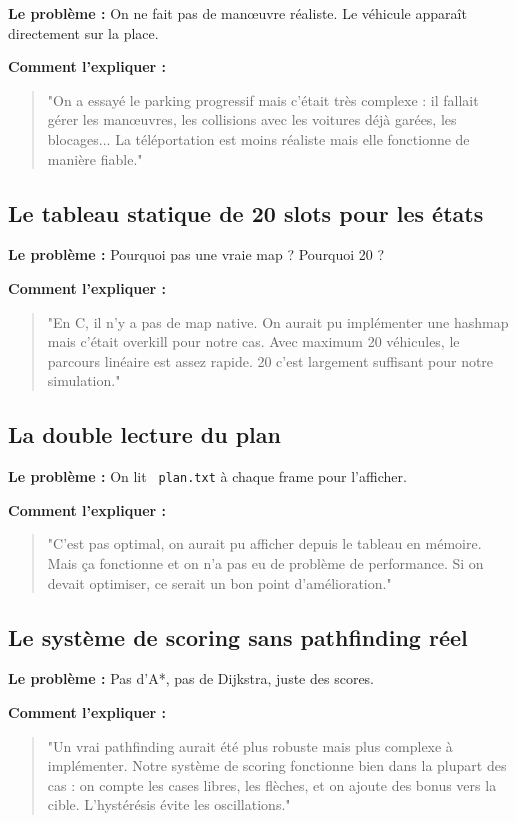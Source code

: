 \documentclass[11pt,a4paper]{article}
\newcommand{\fichier}[1]{\texttt{\textcolor{primary}{\faIcon{file-code} #1}}}
\begin{document}
\textbf{Le problème :} On ne fait pas de manœuvre réaliste. Le véhicule apparaît directement sur la place.

\textbf{Comment l'expliquer :}
\begin{quote}
"On a essayé le parking progressif mais c'était très complexe : il fallait gérer les manœuvres, les collisions avec les voitures déjà garées, les blocages... La téléportation est moins réaliste mais elle fonctionne de manière fiable."
\end{quote}

\subsection{Le tableau statique de 20 slots pour les états}

\textbf{Le problème :} Pourquoi pas une vraie map ? Pourquoi 20 ?

\textbf{Comment l'expliquer :}
\begin{quote}
"En C, il n'y a pas de map native. On aurait pu implémenter une hashmap mais c'était overkill pour notre cas. Avec maximum 20 véhicules, le parcours linéaire est assez rapide. 20 c'est largement suffisant pour notre simulation."
\end{quote}

\subsection{La double lecture du plan}

\textbf{Le problème :} On lit \fichier{plan.txt} à chaque frame pour l'afficher.

\textbf{Comment l'expliquer :}
\begin{quote}
"C'est pas optimal, on aurait pu afficher depuis le tableau en mémoire. Mais ça fonctionne et on n'a pas eu de problème de performance. Si on devait optimiser, ce serait un bon point d'amélioration."
\end{quote}

\subsection{Le système de scoring sans pathfinding réel}

\textbf{Le problème :} Pas d'A*, pas de Dijkstra, juste des scores.

\textbf{Comment l'expliquer :}
\begin{quote}
"Un vrai pathfinding aurait été plus robuste mais plus complexe à implémenter. Notre système de scoring fonctionne bien dans la plupart des cas : on compte les cases libres, les flèches, et on ajoute des bonus vers la cible. L'hystérésis évite les oscillations."
\end{quote}
\end{document}
